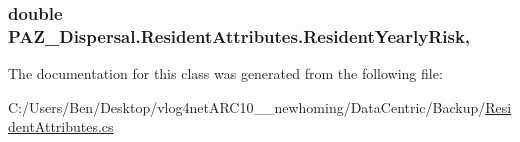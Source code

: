 \hypertarget{class_p_a_z___dispersal_1_1_resident_attributes_a4727fe1ce57d5cbed0c093394c8991e7}{
\subsubsection[{Resident\-Yearly\-Risk}]{\setlength{\rightskip}{0pt plus 5cm}double P\-A\-Z\-\_\-\-Dispersal.\-Resident\-Attributes.\-Resident\-Yearly\-Risk\hspace{0.3cm}{\ttfamily [get]}, {\ttfamily [set]}}}\label{class_p_a_z___dispersal_1_1_resident_attributes_a4727fe1ce57d5cbed0c093394c8991e7}


The documentation for this class was generated from the following file\-:\begin{DoxyCompactItemize}
\item 
C\-:/\-Users/\-Ben/\-Desktop/vlog4net\-A\-R\-C10\-\_\-\_\-newhoming/\-Data\-Centric/\-Backup/\hyperlink{_backup_2_resident_attributes_8cs}{Resident\-Attributes.\-cs}\end{DoxyCompactItemize}
